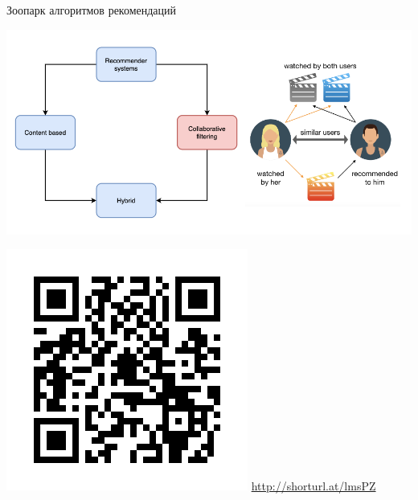 \documentclass[11pt,aspectratio=169,handout]{beamer}
\begin{document}
\begin{frame}{Зоопарк алгоритмов рекомендаций \cite{ali_2021}}

\begin{center}
\includegraphics[scale=0.27]{images/taxonomy-3.png}
\end{center}

\includegraphics[scale=0.16]{images/poll.png} \hfill \url{http://shorturl.at/lmsPZ}

\end{frame}
\end{document}
